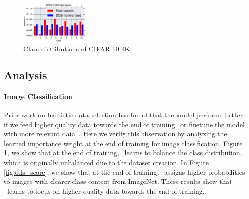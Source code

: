 
\begin{figure}
  \vspace{-12mm}
  \begin{center}
    \includegraphics[width=0.3\textwidth]{figs/cifar10_dds.eps}
  \end{center}
  \vspace{-4mm}
  \caption{\label{fig:dds_distribution}Class distributions of CIFAR-10 4K.}
  \vspace{-4mm}
\end{figure}

\subsection{Analysis}
 \paragraph{Image Classification}
 Prior work on heuristic data selection has found that the model performs better if we feed higher quality data towards the end of training~\citep{dynamic_data_selection_nmt} or finetune the model with more relevant data~\citep{dynamic}. Here we verify this observation by analyzing the learned importance weight at the end of training for image classification. Figure \ref{fig:dds_distribution}, we show that at the end of training, \dds~learns to balance the class distribution, which is originally unbalanced due to the dataset creation. In Figure \ref{fig:dds_score}, we show that at the end of training, \dds~assigns higher probabilities to images with clearer class content from ImageNet. These results show that \dds~learns to focus on higher quality data towards the end of training.  

